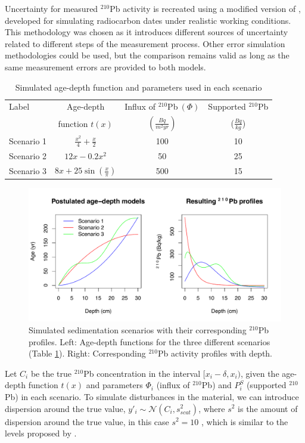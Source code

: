 \documentclass [10pt] {article}
\begin{document}
Uncertainty for measured $^{210}$Pb  activity is recreated using a modified version of \citet{Blaauw2018}, developed for simulating radiocarbon dates under realistic working conditions.
This methodology was chosen as it introduces different sources of uncertainty related to different steps of the measurement process.
Other error simulation methodologies could be used, but the comparison remains valid as long as the same measurement errors are provided to both models.

\begin{table}[!h]
	\centering
	\begin{tabular}{l|ccc}
	     Label   & 	Age-depth			&	Influx of $^{210}$Pb$~(\Phi)$	& Supported $^{210}$Pb  \\
			&	function $t(x)$		&	$(\frac{Bq}{m^2yr})$	& ($\frac{Bq}{kg}$) 	\\ \hline
Scenario 1 	&	$\frac{x^2}{4} + \frac{x}{2}$	&	100	& 10	\\
Scenario 2 	&	$12x -0.2x^2$			&	50	& 25	\\
Scenario 3 	&	$8x+25\sin(\frac{x}{\pi})$	&	500 	& 15		
	\end{tabular}
	\label{tab:sim_param}
	\caption{Simulated age-depth function and parameters used in each scenario}
\end{table}

\begin{figure}[!h]
 \centering
  \includegraphics[width=.95\linewidth]{chronology.pdf}
	\caption{Simulated sedimentation scenarios with their corresponding $^{210}$Pb profiles. Left: Age-depth functions for the three different scenarios (Table \ref{tab:sim_param}). Right: Corresponding $^{210}$Pb activity profiles with depth.}
  \label{fig:true_210}
\end{figure}

	Let $C_{i}$ be the true $^{210}$Pb concentration in the interval $[ x_i-\delta, x_i)$, given the age-depth function $t(x)$ and parameters $\Phi_i$ (influx of $^{210}$Pb) and $P_i^S$ (supported $^{210}$Pb) in each scenario. 
To simulate disturbances in the material, we can introduce dispersion around the true value, $y'_i \sim \mathcal{N}\left(C_i,s^2_{scat} \right)$, where $s^2$ is the amount of dispersion around the true value, in this case $s^2=10$ , which is similar to the levels proposed by \citet{Blaauw2018}. 
\end{document}
